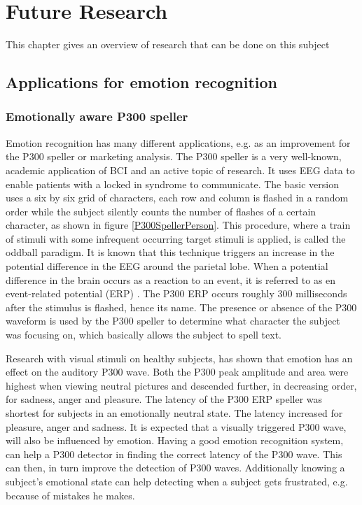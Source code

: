 \chapter{Future Research}
{\samenvatting This chapter gives an overview of research that can be done on this subject}

\section{Applications for emotion recognition}
\subsection{Emotionally aware P300 speller}

Emotion recognition has many different applications, e.g. as an improvement for the P300 speller or marketing analysis. The P300 speller is a very well-known, academic application of BCI and an active topic of research. It uses EEG data to enable patients with a locked in syndrome to communicate\cite{P300Origin}. The basic version uses a six by six grid of characters, each row and column is flashed in a random order while the subject silently counts the number of flashes of a certain character, as shown in figure \ref{P300SpellerPerson}. This procedure, where a train of stimuli with some infrequent occurring target stimuli is applied, is called the oddball paradigm\cite{PaperThibault}. It is known that this technique triggers an increase in the potential difference in the EEG around the parietal lobe. When a potential difference in the brain occurs as a reaction to an event, it is referred to as en event-related potential (ERP) . The P300 ERP occurs roughly 300 milliseconds after the stimulus is flashed, hence its name\citep{ComparisonClassifications}. The presence or absence of the P300 waveform is used by the P300 speller to determine what character the subject was focusing on, which basically allows the subject to spell text. 


Research with visual stimuli on healthy subjects, has shown that emotion has an effect on the auditory P300 wave\cite{AuditoryP300Effect}. Both the P300 peak amplitude and area were highest when viewing neutral pictures and descended further, in decreasing order, for sadness, anger and pleasure. The latency of the P300 ERP speller was shortest for subjects in an emotionally neutral state. The latency increased for pleasure, anger and sadness. It is expected that a visually triggered P300 wave, will also be influenced by emotion. Having a good emotion recognition system, can help a P300 detector in finding the correct latency of the P300 wave. This can then, in turn improve the detection of P300 waves. Additionally knowing a subject's emotional state can help detecting when a subject gets frustrated, e.g. because of mistakes he makes.

